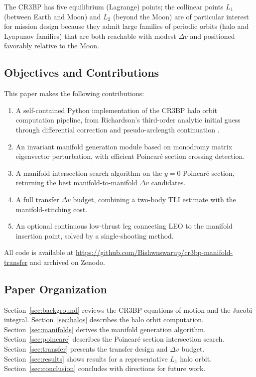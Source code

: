 \documentclass[12pt, a4paper]{article}
\begin{document}
The CR3BP has five equilibrium (Lagrange) points; the collinear points
$L_1$ (between Earth and Moon) and $L_2$ (beyond the Moon) are of
particular interest for mission design because they admit large families
of periodic orbits (halo and Lyapunov families) that are both reachable
with modest $\Delta v$ and positioned favorably relative to the Moon.

\subsection*{Objectives and Contributions}

This paper makes the following contributions:
\begin{enumerate}
  \item A self-contained Python implementation of the CR3BP halo orbit
    computation pipeline, from Richardson's third-order analytic initial
    guess \citep{Richardson1980} through differential correction
    \citep{Howell1984} and pseudo-arclength continuation \citep{Keller1977}.
  \item An invariant manifold generation module based on monodromy matrix
    eigenvector perturbation, with efficient Poincaré section crossing
    detection.
  \item A manifold intersection search algorithm on the $y=0$ Poincaré
    section, returning the best manifold-to-manifold $\Delta v$ candidates.
  \item A full transfer $\Delta v$ budget, combining a two-body TLI estimate
    with the manifold-stitching cost.
  \item An optional continuous low-thrust leg connecting LEO to the manifold
    insertion point, solved by a single-shooting method.
\end{enumerate}

All code is available at
\url{https://github.com/Bishwaswarup/cr3bp-manifold-transfer}
and archived on Zenodo.

\subsection*{Paper Organization}

Section~\ref{sec:background} reviews the CR3BP equations of motion and
the Jacobi integral.
Section~\ref{sec:halos} describes the halo orbit computation.
Section~\ref{sec:manifolds} derives the manifold generation algorithm.
Section~\ref{sec:poincare} describes the Poincaré section intersection
search.
Section~\ref{sec:transfer} presents the transfer design and $\Delta v$
budget.
Section~\ref{sec:results} shows results for a representative $L_1$ halo
orbit.
Section~\ref{sec:conclusion} concludes with directions for future work.
\end{document}

